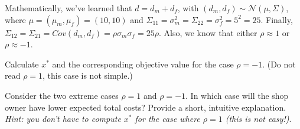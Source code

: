 \documentclass[assignments]{subfiles}
\begin{document}
Mathematically, we've learned that $d = d_m + d_f$, with $(d_m, d_f) \sim \mathcal{N}(\mu, \Sigma)$, where $\mu = (\mu_m, \mu_f) = (10,10)$ and $\Sigma_{11} = \sigma_m^2 = \Sigma_{22}  = \sigma_f^2 = 5^2 = 25$. Finally, $\Sigma_{12} = \Sigma_{21} = Cov(d_m, d_f) = \rho \sigma_m \sigma_f = 25 \rho$. Also, we know that either $\rho \approx 1$ or $\rho \approx -1$.

\begin{exercise}
 Calculate $x^*$ and the corresponding objective value for the case $\rho = -1$. (Do not read  $\rho=1$, this case is not simple.)
\end{exercise}

\begin{exercise}
Consider the two extreme cases $\rho = 1$ and $\rho = -1$.
In which case will the shop owner have lower expected total costs?
Provide a short, intuitive explanation.
\textit{Hint: you don't have to compute $x^*$ for the case where $\rho = 1$ (this is not easy!)}.
\end{exercise}
\end{document}
